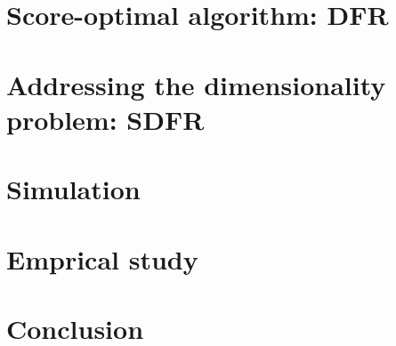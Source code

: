 \documentclass[12pt]{beamer}
\begin{document}
\begin{frame}
\end{frame}

\section{Score-optimal algorithm: DFR}

\section{Addressing the dimensionality problem: SDFR}

\section{Simulation}

\section{Emprical study}

\section{Conclusion}





\end{document}
